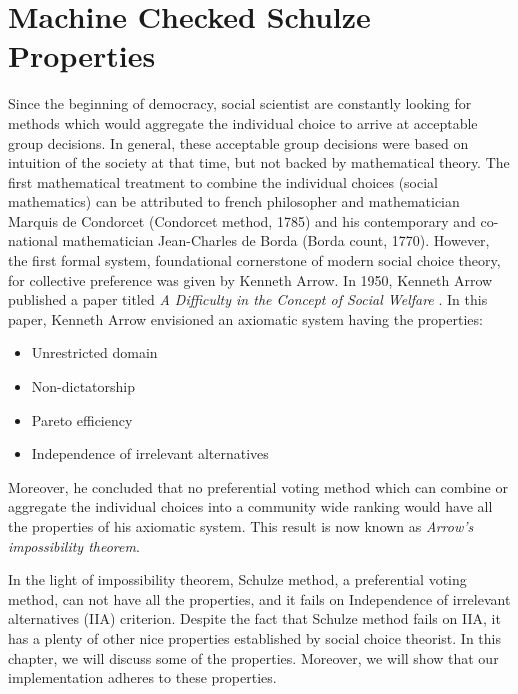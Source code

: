 \chapter{Machine Checked Schulze Properties}
\label{cha:machine_checked}


 Since the beginning of democracy, social scientist are constantly looking for methods  which would 
 aggregate the individual choice  to arrive at acceptable group decisions. 
 In general, these acceptable group decisions were based on intuition of the society at that time,
 but not backed by mathematical theory. The first mathematical 
 treatment to combine the individual choices (social mathematics)  can be 
 attributed to french philosopher and mathematician Marquis de Condorcet (Condorcet method, 1785) and his contemporary
 and co-national mathematician Jean-Charles de Borda (Borda count, 1770). However, the first formal system, foundational cornerstone
 of modern social choice theory, for collective preference was given by Kenneth Arrow. In 1950, Kenneth Arrow 
 published a paper titled \textit{A Difficulty in the Concept of Social Welfare} \citep{arrow1950difficulty}. 
 In this paper, Kenneth Arrow envisioned an axiomatic system having the properties:
 
 \begin{itemize}
 \item Unrestricted domain
 \item Non-dictatorship
 \item Pareto efficiency
 \item Independence of irrelevant alternatives
 \end{itemize}
 
 Moreover, he concluded that no preferential voting method which can combine or aggregate the individual choices into a community wide 
 ranking would have all the properties of his axiomatic system. This result is now known as \textit{Arrow's impossibility theorem}. 


 In the light of impossibility theorem, Schulze method, a preferential voting method, can not have all the properties, and it fails on 
 Independence of irrelevant alternatives (IIA) criterion. Despite the fact that Schulze method fails on IIA,  it has a plenty of other nice 
 properties established by social choice theorist. In this chapter, we will discuss some of 
 the properties.  Moreover, we will show that our implementation adheres to these properties. 
 
